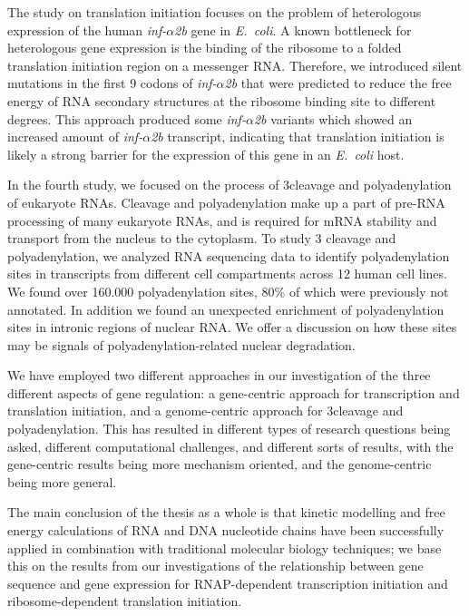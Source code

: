 The study on translation initiation focuses on the problem of heterologous
expression of the human \textit{inf-$\alpha$2b} gene in \textit{E.\ coli}. A
known bottleneck for heterologous gene expression is the binding of the
ribosome to a folded translation initiation region on a messenger RNA.
Therefore, we introduced silent mutations in the first 9 codons of
\textit{inf-$\alpha$2b} that were predicted to reduce the free energy of RNA
secondary structures at the ribosome binding site to different degrees. This
approach produced some \textit{inf-$\alpha$2b} variants which showed an 
increased amount of \textit{inf-$\alpha$2b} transcript, indicating that
translation initiation is likely a strong barrier for the expression of this
gene in an \textit{E.\ coli} host.

In the fourth study, we focused on the process of 3\ppp cleavage and
polyadenylation of eukaryote RNAs. Cleavage and polyadenylation make up a part
of pre-RNA processing of many eukaryote RNAs, and is required for mRNA
stability and transport from the nucleus to the cytoplasm. To study 3\ppp
cleavage and polyadenylation, we analyzed RNA sequencing data to identify
polyadenylation sites in transcripts from different cell compartments across
12 human cell lines. We found over 160.000 polyadenylation sites, 80\% of
which were previously not annotated. In addition we found an unexpected
enrichment of polyadenylation sites in intronic regions of nuclear RNA. We
offer a discussion on how these sites may be signals of
polyadenylation-related nuclear degradation.

We have employed two different approaches in our investigation of the three
different aspects of gene regulation: a gene-centric approach for transcription
and translation initiation, and a genome-centric approach for 3\ppp cleavage
and polyadenylation. This has resulted in different types of research questions
being asked, different computational challenges, and different sorts of
results, with the gene-centric results being more mechanism oriented, and the
genome-centric being more general.

The main conclusion of the thesis as a whole is that kinetic modelling and
free energy calculations of RNA and DNA nucleotide chains have been
successfully applied in combination with traditional molecular biology
techniques; we base this on the results from our investigations of the
relationship between gene sequence and gene expression for RNAP-dependent
transcription initiation and ribosome-dependent translation initiation.
